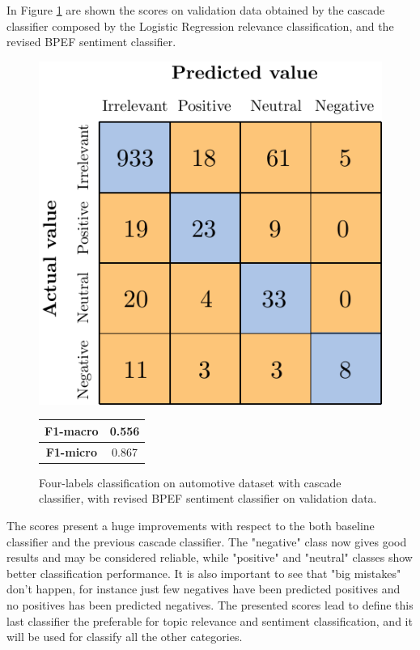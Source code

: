 In Figure \ref{fig:ita_cascade_bpef_val} are shown the scores on validation data obtained by the cascade classifier composed by the Logistic Regression relevance classification, and the revised BPEF sentiment classifier.

\begin{figure}[H]
	\begin{minipage}[b]{0.6\linewidth}
		\centering
		\includegraphics[scale=1]{figures/conf_matrices/ita_cascade_bpef/ita_cascade_bpef_val.pdf}
	\end{minipage}
	\begin{minipage}[b]{0.3\linewidth}
		\begin{tabular}[b]{ | c | c | } 
			\hline
			\textbf{F1-macro} & 0.556 \\
			\hline
			\textbf{F1-micro} & 0.867 \\ 
			\hline
		\end{tabular}
	\end{minipage}
	\caption{Four-labels classification on automotive dataset with cascade classifier, with revised BPEF sentiment classifier on validation data.}
	\label{fig:ita_cascade_bpef_val}
\end{figure}


The scores present a huge improvements with respect to the both baseline classifier and the previous cascade classifier. The "negative" class now gives good results and may be considered reliable, while "positive" and "neutral" classes show better classification performance. It is also important to see that "big mistakes" don't happen, for instance just few negatives have been predicted positives and no positives has been predicted negatives. The presented scores lead to define this last classifier the preferable for topic relevance and sentiment classification, and it will be used for classify all the other categories.




